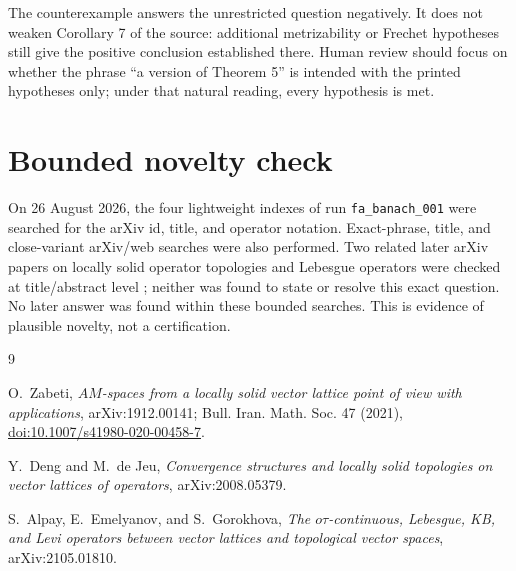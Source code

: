 \documentclass[11pt]{article}
\begin{document}
The counterexample answers the unrestricted question negatively.  It does not
weaken Corollary 7 of the source: additional metrizability or Frechet
hypotheses still give the positive conclusion established there.  Human review
should focus on whether the phrase ``a version of Theorem 5'' is intended with
the printed hypotheses only; under that natural reading, every hypothesis is
met.

\section{Bounded novelty check}

On 26 August 2026, the four lightweight indexes of run
\texttt{fa\_banach\_001} were searched for the arXiv id, title, and operator
notation.  Exact-phrase, title, and close-variant arXiv/web searches were also
performed.  Two related later arXiv papers on locally solid operator
topologies and Lebesgue operators were checked at title/abstract level
\cite{dengdejeu,alpay}; neither was found to state or resolve this exact
question.  No later answer was found within these bounded searches.  This is
evidence of plausible novelty, not a certification.

\enlargethispage{2\baselineskip}
\footnotesize
\begin{thebibliography}{9}

O.~Zabeti,
\emph{$AM$-spaces from a locally solid vector lattice point of view with
applications}, arXiv:1912.00141; Bull. Iran. Math. Soc. 47 (2021),
\href{https://doi.org/10.1007/s41980-020-00458-7}{doi:10.1007/s41980-020-00458-7}.

Y.~Deng and M.~de Jeu,
\emph{Convergence structures and locally solid topologies on vector lattices
of operators}, arXiv:2008.05379.

S.~Alpay, E.~Emelyanov, and S.~Gorokhova,
\emph{The $o\tau$-continuous, Lebesgue, KB, and Levi operators between vector
lattices and topological vector spaces}, arXiv:2105.01810.

\end{thebibliography}
\end{document}
